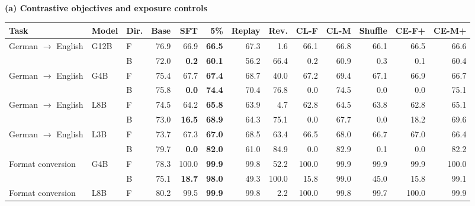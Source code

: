 \begin{table}[!t]
\centering\footnotesize
\textbf{(a) Contrastive objectives and exposure controls}\par\smallskip
\setlength{\tabcolsep}{3pt}
\begin{tabular}{lllrrrrrrrrrr}
\toprule
Task & Model & Dir. & Base & SFT & 5\% & Replay & Rev. & CL-F & CL-M & Shuffle & CE-F+ & CE-M+ \\
\midrule
German $\to$ English & G12B & F & 76.9 & 66.9 & \textcolor{blue!60!black}{\textbf{66.5}} & 67.3 & 1.6 & 66.1 & 66.8 & 66.1 & 66.5 & 66.6 \\
 &  & B & 72.0 & \textcolor{red!70!black}{\textbf{0.2}} & \textcolor{blue!60!black}{\textbf{60.1}} & 56.2 & 66.4 & 0.2 & 60.9 & 0.3 & 0.1 & 60.4 \\
\addlinespace[2pt]
German $\to$ English & G4B & F & 75.4 & 67.7 & \textcolor{blue!60!black}{\textbf{67.4}} & 68.7 & 40.0 & 67.2 & 69.4 & 67.1 & 66.9 & 66.7 \\
 &  & B & 75.8 & \textcolor{red!70!black}{\textbf{0.0}} & \textcolor{blue!60!black}{\textbf{74.4}} & 70.4 & 76.8 & 0.0 & 74.5 & 0.0 & 0.0 & 75.1 \\
\addlinespace[2pt]
German $\to$ English & L8B & F & 74.5 & 64.2 & \textcolor{blue!60!black}{\textbf{65.8}} & 63.9 & 4.7 & 62.8 & 64.5 & 63.8 & 62.8 & 65.1 \\
 &  & B & 73.0 & \textcolor{red!70!black}{\textbf{16.5}} & \textcolor{blue!60!black}{\textbf{68.9}} & 64.3 & 75.1 & 0.0 & 67.7 & 0.0 & 18.2 & 69.6 \\
\addlinespace[2pt]
German $\to$ English & L3B & F & 73.7 & 67.3 & \textcolor{blue!60!black}{\textbf{67.0}} & 68.5 & 63.4 & 66.5 & 68.0 & 66.7 & 67.0 & 66.4 \\
 &  & B & 79.7 & \textcolor{red!70!black}{\textbf{0.0}} & \textcolor{blue!60!black}{\textbf{82.0}} & 61.0 & 84.9 & 0.0 & 82.9 & 0.1 & 0.0 & 82.2 \\
\addlinespace[2pt]
Format conversion & G4B & F & 78.3 & 100.0 & \textcolor{blue!60!black}{\textbf{99.9}} & 99.8 & 52.2 & 100.0 & 99.9 & 99.9 & 99.9 & 100.0 \\
 &  & B & 75.1 & \textcolor{red!70!black}{\textbf{18.7}} & \textcolor{blue!60!black}{\textbf{98.0}} & 49.3 & 100.0 & 15.8 & 99.0 & 45.0 & 15.8 & 99.1 \\
\addlinespace[2pt]
Format conversion & L8B & F & 80.2 & 99.5 & \textcolor{blue!60!black}{\textbf{99.9}} & 99.8 & 2.2 & 100.0 & 99.8 & 99.7 & 100.0 & 99.9 \\

\end{tabular}
\end{table}
